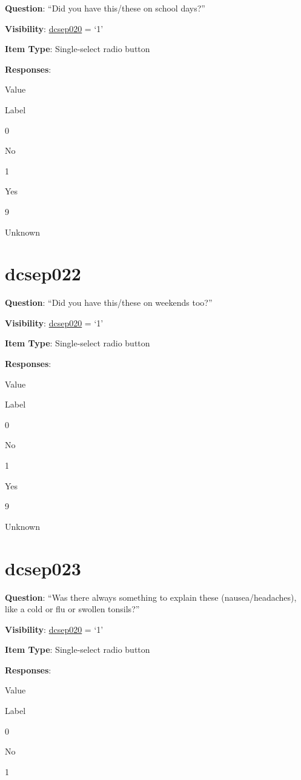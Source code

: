 \documentclass[]{book}
\begin{document}
\textbf{Question}: ``Did you have this/these on school days?''

\textbf{Visibility}: \protect\hyperlink{dcsep020}{dcsep020} = `1'

\textbf{Item Type}: Single-select radio button

\textbf{Responses}:

Value

Label

0

No

1

Yes

9

Unknown

\hypertarget{dcsep022}{%
\section{dcsep022}\label{dcsep022}}

\textbf{Question}: ``Did you have this/these on weekends too?''

\textbf{Visibility}: \protect\hyperlink{dcsep020}{dcsep020} = `1'

\textbf{Item Type}: Single-select radio button

\textbf{Responses}:

Value

Label

0

No

1

Yes

9

Unknown

\hypertarget{dcsep023}{%
\section{dcsep023}\label{dcsep023}}

\textbf{Question}: ``Was there always something to explain these (nausea/headaches), like a cold or flu or swollen tonsils?''

\textbf{Visibility}: \protect\hyperlink{dcsep020}{dcsep020} = `1'

\textbf{Item Type}: Single-select radio button

\textbf{Responses}:

Value

Label

0

No

1
\end{document}
